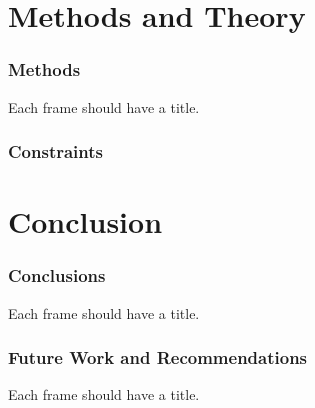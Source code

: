 \documentclass{beamer}
\begin{document}
\section{Methods and Theory}
\begin{frame}\frametitle{Methods} 
Each frame should have a title.
\end{frame}

\begin{frame}\frametitle{Constraints} 
\href{http://localhost:8081/nek_dep.html}{}
\end{frame}

\section{Conclusion}
\begin{frame}\frametitle{Conclusions} 
Each frame should have a title.
\end{frame}

\begin{frame}\frametitle{Future Work and Recommendations} 
Each frame should have a title.
\end{frame}
\end{document}
